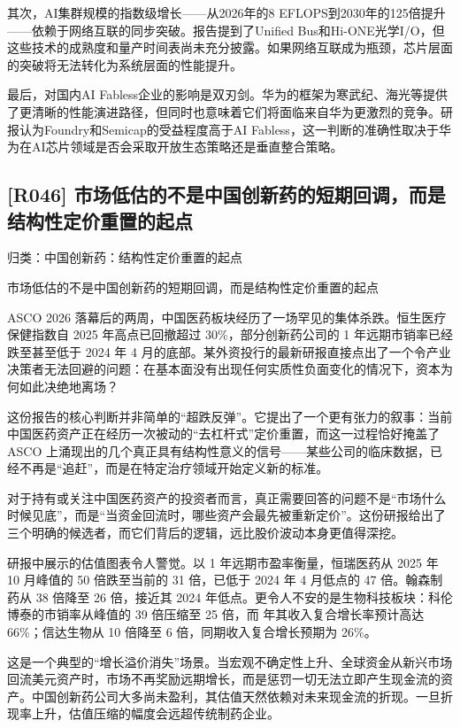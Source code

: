 \documentclass[11pt]{ctexart}
\begin{document}
其次，AI集群规模的指数级增长——从2026年的8 EFLOPS到2030年的125倍提升——依赖于网络互联的同步突破。报告提到了Unified Bus和Hi-ONE光学I/O，但这些技术的成熟度和量产时间表尚未充分披露。如果网络互联成为瓶颈，芯片层面的突破将无法转化为系统层面的性能提升。

最后，对国内AI Fabless企业的影响是双刃剑。华为的框架为寒武纪、海光等提供了更清晰的性能演进路径，但同时也意味着它们将面临来自华为更激烈的竞争。研报认为Foundry和Semicap的受益程度高于AI Fabless，这一判断的准确性取决于华为在AI芯片领域是否会采取开放生态策略还是垂直整合策略。

\subsection{[R046] 市场低估的不是中国创新药的短期回调，而是结构性定价重置的起点}
{\small\color{refgray}归类：中国创新药：结构性定价重置的起点}

市场低估的不是中国创新药的短期回调，而是结构性定价重置的起点

ASCO 2026 落幕后的两周，中国医药板块经历了一场罕见的集体杀跌。恒生医疗保健指数自 2025 年高点已回撤超过 30\%，部分创新药公司的 1 年远期市销率已经跌至甚至低于 2024 年 4 月的底部。某外资投行的最新研报直接点出了一个令产业决策者无法回避的问题：在基本面没有出现任何实质性负面变化的情况下，资本为何如此决绝地离场？

这份报告的核心判断并非简单的“超跌反弹”。它提出了一个更有张力的叙事：当前中国医药资产正在经历一次被动的“去杠杆式”定价重置，而这一过程恰好掩盖了 ASCO 上涌现出的几个真正具有结构性意义的信号——某些公司的临床数据，已经不再是“追赶”，而是在特定治疗领域开始定义新的标准。

对于持有或关注中国医药资产的投资者而言，真正需要回答的问题不是“市场什么时候见底”，而是“当资金回流时，哪些资产会最先被重新定价”。这份研报给出了三个明确的候选者，而它们背后的逻辑，远比股价波动本身更值得深挖。

研报中展示的估值图表令人警觉。以 1 年远期市盈率衡量，恒瑞医药从 2025 年 10 月峰值的 50 倍跌至当前的 31 倍，已低于 2024 年 4 月低点的 47 倍。翰森制药从 38 倍降至 26 倍，接近其 2024 年低点。更令人不安的是生物科技板块：科伦博泰的市销率从峰值的 39 倍压缩至 25 倍，而 年其收入复合增长率预计高达 66\%；信达生物从 10 倍降至 6 倍，同期收入复合增长预期为 26\%。

这是一个典型的“增长溢价消失”场景。当宏观不确定性上升、全球资金从新兴市场回流美元资产时，市场不再奖励远期增长，而是惩罚一切无法立即产生现金流的资产。中国创新药公司大多尚未盈利，其估值天然依赖对未来现金流的折现。一旦折现率上升，估值压缩的幅度会远超传统制药企业。
\end{document}
